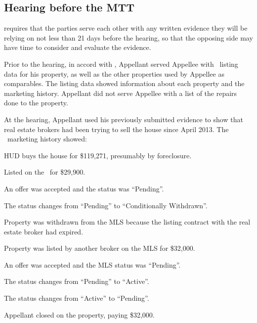 \documentclass[12pt,\documentclassflag]{michiganCourtOfAppealsBrief}
\def\ttr287{\pincite[s]{TTR}{287}}
\begin{document}
\subsection{Hearing before the MTT}

\ttr287 requires that the parties serve each other with any written evidence they will be relying on not less than 21 days before the hearing, so that the opposing side may have time to consider and evaluate the evidence.

Prior to the hearing, in accord with \ttr287, Appellant served Appellee with \MLS\ listing data for his property, as well as the other properties used by Appellee as comparables. The listing data showed information about each property and the marketing history. Appellant did not serve Appellee with a list of the repairs done to the property.

At the hearing, Appellant used his previously submitted evidence to show that real estate brokers had been trying to sell the house since April 2013. The \MLS\ marketing history showed: 

\begin{description}[style=multiline,leftmargin=3cm,font=\normalfont,itemsep=.5\baselineskip,align=right]
  \singlespacing 
\item[3/16/2005] HUD buys the house for \$119,271, presumably by foreclosure. 
\item[4/3/2013] Listed on the \MLS\ for \$29,900. 
\item[5/3/2013] An offer was accepted and the status was ``Pending''.
\item[10/23/2013] The status changes from ``Pending'' to ``Conditionally Withdrawn''. 
\item[10/24/2013] Property was withdrawn from the MLS because the listing contract with the real estate broker had expired. 
\item[6/17/2015] Property was listed by another broker on the MLS for \$32,000. 
\item[6/29/2015] An offer was accepted and the MLS status was ``Pending''. 
\item[7/3/2015] The status changes from ``Pending'' to ``Active''.
\item[7/6/2015] The status changes from ``Active''  to ``Pending''.
\item[8/19/2015] Appellant closed on the property, paying \$32,000. 
\end{description}
\end{document}
